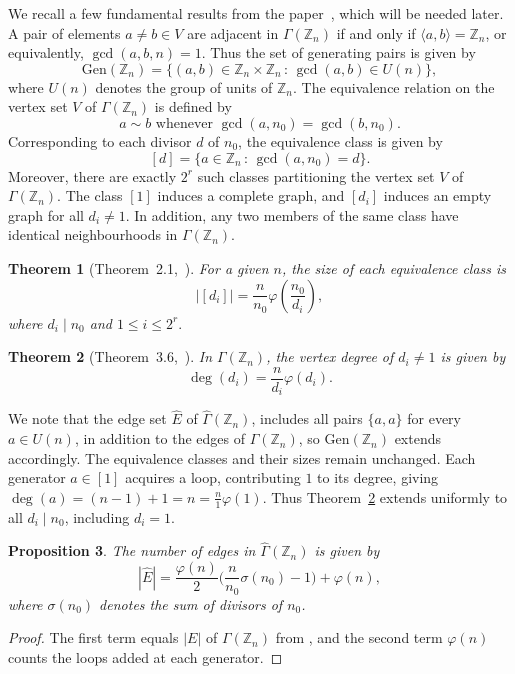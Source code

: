 \documentclass[11pt]{article}
\def \Z {{\mathbb Z}}
\newtheorem{theorem}{Theorem}[section]
\newtheorem{pro}[theorem]{Proposition}
\newtheorem{rem}[theorem]{Remark}
\begin{document}
We recall a few fundamental results from the paper~\cite{Me}, which will be needed later. A pair of elements $a \neq b \in V$ are adjacent in $\Gamma(\Z_n)$ if and only if 
$\langle a, b \rangle = \Z_n$, or equivalently, $\gcd(a, b, n) = 1$. 
Thus the set of generating pairs is given by
\begin{equation}\label{eq:class}
\mathrm{Gen}(\Z_n) = \{(a,b) \in \Z_n \times \Z_n \,:\,  \gcd(a,b) \in 
U(n)\},
\end{equation}
where $U(n)$ denotes the group of units of $\Z_n$. The equivalence 
relation on the vertex set $V$ of $\Gamma(\Z_n)$ is defined by 
$$a \sim b \text{ whenever } \gcd(a, n_0) = \gcd(b, n_0).$$ 
Corresponding to each divisor $d$ of $n_0$, the equivalence class is given by 
$$[d] = \{a \in \Z_n \,:\,  \gcd(a, n_0) = d\}.$$ 
Moreover, there are exactly $2^r$ such classes partitioning the vertex set $V$ of $\Gamma(\Z_n)$. The class $[1]$ 
induces a complete graph, and $[d_i]$ induces an empty graph for all 
$d_i \neq 1$. In addition, any two members of the same class have 
identical neighbourhoods in $\Gamma(\Z_n)$.

\begin{theorem}[Theorem~2.1,~\cite{Me}]
For a given $n$, the size of each equivalence class is 
$$|[d_i]| = \frac{n}{n_0}\varphi\!\left(\frac{n_0}{d_i}\right),$$
where $d_i \mid n_0$ and $1 \leq i \leq 2^r.$
\end{theorem}

\begin{theorem}[Theorem~3.6,~\cite{Me}]\label{thm:deg}
In $\Gamma(\Z_n)$, the vertex degree of $d_i \neq 1$ is given by 
$$\deg(d_i) = \frac{n}{d_i}\varphi(d_i).$$
\end{theorem}

We note that the edge set $\widehat{E}$ of $\widehat{\Gamma}(\Z_n)$,  includes all 
pairs $\{a,a\}$ for every $a \in U(n)$, in addition to the edges of 
$\Gamma(\Z_n)$, so $\mathrm{Gen}(\Z_n)$ extends accordingly. The 
equivalence classes and their sizes remain unchanged. Each generator 
$a \in [1]$ acquires a loop, contributing $1$ to its degree, giving 
$\deg(a) = (n-1) + 1 = n = \frac{n}{1}\varphi(1)$. Thus 
Theorem~\ref{thm:deg} extends uniformly to all $d_i \mid n_0$, 
including $d_i = 1$.

\begin{pro}
The number of edges in $\widehat{\Gamma}(\mathbb{Z}_n)$ is given by
$$|\widehat{E}| = \frac{\varphi(n)}{2}\biggl(\frac{n}{n_0}\sigma(n_0) 
- 1\biggr) + \varphi(n),$$
where $\sigma(n_0)$ denotes the sum of divisors of $n_0$.
\end{pro}
\begin{proof}
The first term equals $|E|$ of $\Gamma(\mathbb{Z}_n)$ from 
\cite[Corollary~3.2.4]{Me}, and the second term $\varphi(n)$ counts 
the loops added at each generator.
\end{proof}
%    
\end{document}
